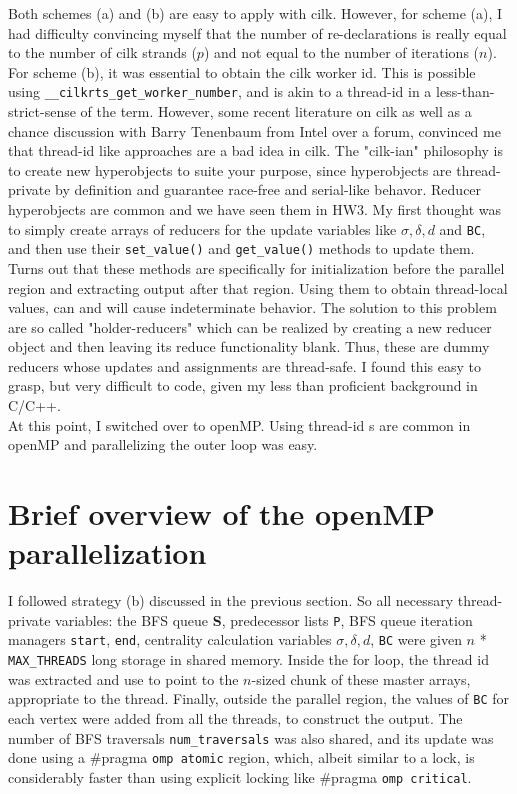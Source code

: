 \documentclass[12pt,letterpaper]{article}
\begin{document}
\noindent Both schemes (a) and (b) are easy to apply with cilk. However, for scheme (a), I had difficulty convincing myself that the number of re-declarations is really equal to the number of cilk strands ($p$) and not equal to the number of iterations ($n$). For scheme (b), it was essential to obtain the cilk worker id. This is possible using \texttt{\_\_cilkrts\_get\_worker\_number}, and is akin to a thread-id in a less-than-strict-sense of the term. However, some recent literature on cilk as well as a chance discussion with Barry Tenenbaum from Intel over a forum, convinced me that thread-id like approaches are a bad idea in cilk. The "cilk-ian" philosophy is to create new hyperobjects to suite your purpose, since hyperobjects are thread-private by definition and guarantee race-free and serial-like behavor. Reducer hyperobjects are common and we have seen them in HW3. My first thought was to simply create arrays of reducers for the update variables like $\sigma, \delta, d$ and \texttt{BC}, and then use their \texttt{set\_value()} and \texttt{get\_value()} methods to update them. Turns out that these methods are specifically for initialization before the parallel region and extracting output after that region. Using them to obtain thread-local values, can and will cause indeterminate behavior. The solution to this problem are so called "holder-reducers" which can be realized by creating a new reducer object and then leaving its reduce functionality blank. Thus, these are dummy reducers whose updates and assignments are thread-safe. I found this easy to grasp, but very difficult to code, given my less than proficient background in C/C++.\\

\noindent At this point, I switched over to openMP. Using thread-id s are common in openMP and parallelizing the outer loop was easy.

\section*{Brief overview of the openMP parallelization}
\noindent I followed strategy (b) discussed in the previous section. So all necessary thread-private variables: the BFS queue \textbf{S}, predecessor lists \texttt{P}, BFS queue iteration managers \texttt{start}, \texttt{end}, centrality calculation variables $\sigma, \delta, d$, \texttt{BC} were given $n$ * \texttt{MAX\_THREADS} long storage in shared memory. Inside the for loop, the thread id was extracted and use to point to the $n$-sized chunk of these master arrays, appropriate to the thread. Finally, outside the parallel region, the values of \texttt{BC} for each vertex were added from all the threads, to construct the output. The number of BFS traversals \texttt{num\_traversals} was also shared, and its update was done using a \#pragma \texttt{omp atomic} region, which, albeit similar to a lock, is considerably faster than using explicit locking like \#pragma \texttt{omp critical}.\\
\end{document}
